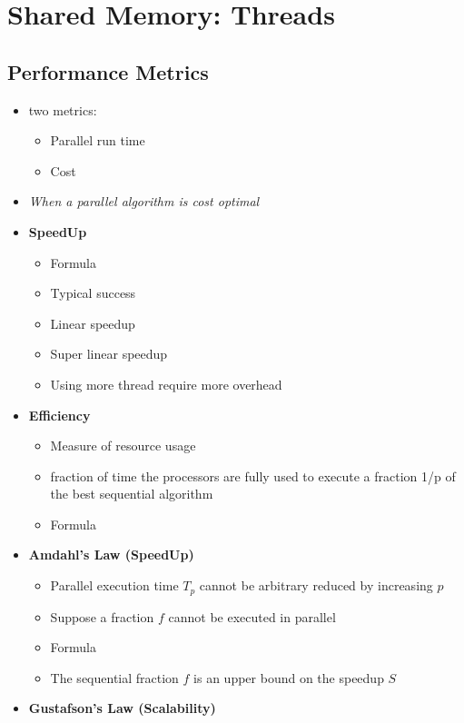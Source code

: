 \documentclass[12pt,oneside]{report}
\begin{document}
\chapter{Shared Memory: Threads}
\section{Performance Metrics}
\begin{itemize}
    \item two metrics:
    \begin{itemize}
        \item Parallel run time
        \item Cost
    \end{itemize}
    \item \textit{When a parallel algorithm is cost optimal}
    \item \textbf{SpeedUp}
    \begin{itemize}
        \item Formula
        \item Typical success
        \item Linear speedup
        \item Super linear speedup
        \item Using more thread require more overhead
    \end{itemize}
    \item \textbf{Efficiency}
    \begin{itemize}
        \item Measure of resource usage
        \item fraction of time the processors are fully used to execute a fraction 1/p of the best sequential algorithm
        \item Formula
    \end{itemize}
    \item \textbf{Amdahl's Law (SpeedUp)}
    \begin{itemize}
        \item Parallel execution time \(T_p\) cannot be arbitrary reduced by increasing \(p\)
        \item Suppose a fraction \(f\) cannot be executed in parallel
        \item Formula
        \item The sequential fraction \(f\) is an upper bound on the speedup \(S\)
    \end{itemize}
    \item \textbf{Gustafson's Law (Scalability)}

\end{itemize}
\end{document}
